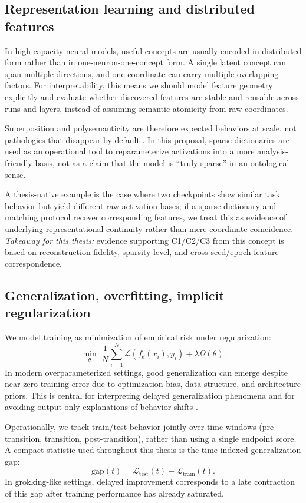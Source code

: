 \documentclass[../ppgc-tese.tex]{subfiles}
\begin{document}
    \subsection{Representation learning and distributed features}
    In high-capacity neural models, useful concepts are usually encoded in distributed form rather than in one-neuron-one-concept form. A single latent concept can span multiple directions, and one coordinate can carry multiple overlapping factors. For interpretability, this means we should model feature geometry explicitly and evaluate whether discovered features are stable and reusable across runs and layers, instead of assuming semantic atomicity from raw coordinates.

    Superposition and polysemanticity are therefore expected behaviors at scale, not pathologies that disappear by default \cite{anthropic2022superposition,anthropic2023monosemanticity}. In this proposal, sparse dictionaries are used as an operational tool to reparameterize activations into a more analysis-friendly basis, not as a claim that the model is ``truly sparse'' in an ontological sense.

    A thesis-native example is the case where two checkpoints show similar task behavior but yield different raw activation bases; if a sparse dictionary and matching protocol recover corresponding features, we treat this as evidence of underlying representational continuity rather than mere coordinate coincidence. \textit{Takeaway for this thesis:} evidence supporting C1/C2/C3 from this concept is based on reconstruction fidelity, sparsity level, and cross-seed/epoch feature correspondence.

    \subsection{Generalization, overfitting, implicit regularization}
    We model training as minimization of empirical risk under regularization:
    \[
    \min_{\theta}\; \frac{1}{N}\sum_{i=1}^{N}\mathcal{L}(f_{\theta}(x_i), y_i) + \lambda\Omega(\theta).
    \]
    In modern overparameterized settings, good generalization can emerge despite near-zero training error due to optimization bias, data structure, and architecture priors. This is central for interpreting delayed generalization phenomena and for avoiding output-only explanations of behavior shifts \cite{kaplan2020scalinglaws,hoffmann2022chinchilla}.

    Operationally, we track train/test behavior jointly over time windows (pre-transition, transition, post-transition), rather than using a single endpoint score. A compact statistic used throughout this thesis is the time-indexed generalization gap:
    \[
    \mathrm{gap}(t)=\mathcal{L}_{\mathrm{test}}(t)-\mathcal{L}_{\mathrm{train}}(t).
    \]
    In grokking-like settings, delayed improvement corresponds to a late contraction of this gap after training performance has already saturated.
\end{document}
